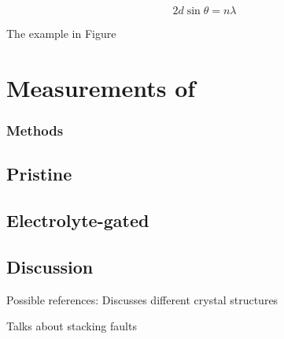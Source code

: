 \begin{equation}
2d \sin \theta = n \lambda
\end{equation}

The example in Figure

\section{Measurements of \rucl}

\subsubsection{Methods}

\subsection{Pristine \rucl}

\subsection{Electrolyte-gated \rucl}

\subsection{Discussion}


Possible references:
Discusses different crystal structures

Talks about stacking faults